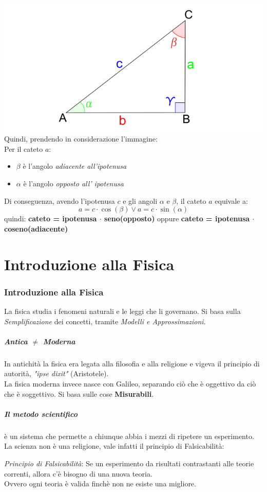 \documentclass[12pt, a4paper, openany]{book}
\begin{document}
\includegraphics[width=\textwidth]{triangoloRettangolo.png}
Quindi, prendendo in considerazione l'immagine:
\\Per il cateto $a$:
\begin{itemize} %
    \item  $\beta$ è l'angolo \emph{adiacente all'ipotenusa}
    \item  $\alpha$ è l'angolo \emph{opposto all' ipotenusa}
\end{itemize}
Di conseguenza, avendo l'ipotenusa $c$ e gli angoli $\alpha$ e $\beta$, il cateto $a$ equivale a:
\[ a = c\cdot \cos(\beta) \vee a = c\cdot \sin(\alpha) \]
quindi: \textbf{cateto = ipotenusa $\cdot$ seno(opposto)} oppure \textbf{cateto = ipotenusa $\cdot$ coseno(adiacente)}
\chapter{Introduzione alla Fisica}

\subsection{Introduzione alla Fisica}
La fisica studia i fenomeni naturali e le leggi che li governano.
Si basa sulla \emph{Semplificazione} dei concetti, tramite \emph{Modelli e Approssimazioni}.


\paragraph{Antica $\neq$ Moderna} In antichità la fisica era legata alla filosofia e alla religione
e vigeva il principio di autorità, \emph{"ipse dixit"} (Aristotele).
\\La fisica moderna invece nasce con Galileo, separando ciò che è oggettivo da ciò che è soggettivo.
Si basa sulle cose \textbf{Misurabili}.
\paragraph{Il metodo scientifico} è un sistema che permette a chiunque abbia i mezzi di ripetere un esperimento.
La scienza non è una religione, vale infatti il principio di Falsicabilità:
\begin{center}
    \emph{Principio di Falsicabilità}: Se un esperimento da risultati contrastanti alle teorie correnti, allora c'è bisogno di una nuova teoria.
    \\Ovvero ogni teoria è valida finchè non ne esiste una migliore.
\end{center}
\end{document}
